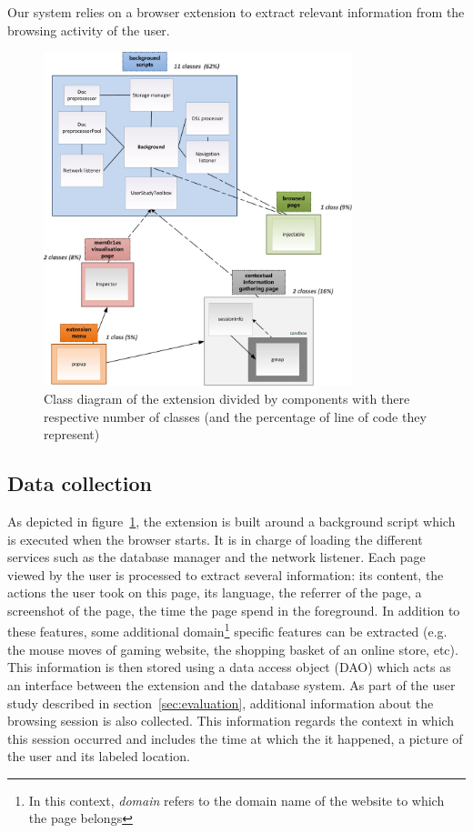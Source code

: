 \documentclass[10pt,a4paper]{article}
\begin{document}
Our system relies on a browser extension to extract relevant information from the browsing activity of the user.

\begin{figure}[h!]
 \centerline{
 	 \includegraphics[width=0.8\textwidth]{figures/architecture.jpg}}
 \caption{ Class diagram of the extension divided by components with there respective number of classes (and the percentage of line of code they represent)}
\label{fig:architecture}
\end{figure}

\subsection{Data collection}
\label{subsec:dataCollection}
As depicted in figure~\ref{fig:architecture}, the extension is built around a background script which is executed when the browser starts. It is in charge of loading the different services such as the database manager and the network listener. Each page viewed by the user is processed to extract several information: its content, the actions the user took on this page, its language, the referrer of the page, a screenshot of the page, the time the page spend in the foreground. In addition to these features, some additional domain\footnote{In this context, \textit{domain} refers to the domain name of the website to which the page belongs} specific features can be extracted (e.g. the mouse moves of gaming website, the shopping basket of an online store, etc). This information is then stored using a data access object (DAO) which acts as an interface between the extension and the database system. As part of the user study described in section~\ref{sec:evaluation}, additional information about the browsing session is also collected. This information regards the context in which this session occurred and includes the time at which the it happened, a picture of the user and its labeled location.
\end{document}
